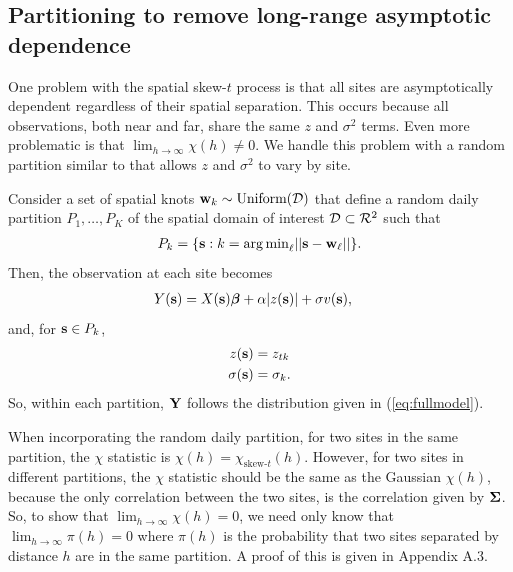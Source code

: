 \documentclass[11pt]{article}
\begin{document}
\subsection{Partitioning to remove long-range asymptotic dependence}\label{s:part}
One problem with the spatial skew-$t$ process is that all sites are asymptotically dependent regardless of their spatial separation.
This occurs because all observations, both near and far, share the same $z$ and $\sigma^2$ terms.
Even more problematic is that $\lim_{h \rightarrow \infty} \chi(h) \neq 0$.
We handle this problem with a random partition similar to \citet{Kim2005} that allows $z$ and $\sigma^2$ to vary by site.

Consider a set of spatial knots $\mbox{\bf w}_{k} \sim \text{Uniform}({\cal D})$ that define a random daily partition $P_{1}, \ldots, P_{K}$ of the spatial domain of interest ${\cal D} \subset {\cal R}^2$ such that
\begin{align*}
  P_{k} = \{ \mbox{\bf s} : k = {\mathop{\rm arg\, min}}_\ell || \mbox{\bf s} - \mbox{\bf w}_{\ell} || \}.
\end{align*}
Then, the observation at each site becomes
\begin{align}
  Y(\mbox{\bf s}) &= X(\mbox{\bf s}) \mbox{\boldmath $\beta$} + \alpha |z(\mbox{\bf s})| + \sigma v(\mbox{\bf s}),
\end{align}
and, for $\mbox{\bf s} \in P_{k}$,
\begin{align}
  z(\mbox{\bf s}) &= z_{tk} \label{eq:sitez}\\
  \sigma(\mbox{\bf s}) &= \sigma_{k} \label{eq:sitesig}.
\end{align}
So, within each partition, $\mbox{\bf Y}$ follows the distribution given in (\ref{eq:fullmodel}).

When incorporating the random daily partition, for two sites in the same partition, the $\chi$ statistic is $\chi(h) = \chi_{\text{skew-}t}(h)$. However, for two sites in different partitions, the $\chi$ statistic should be the same as the Gaussian $\chi(h)$, because the only correlation between the two sites, is the correlation given by $\mbox{\boldmath $\Sigma$}$.
So, to show that $\lim_{h \rightarrow \infty} \chi(h) = 0$, we need only know that $\lim_{h \rightarrow \infty} \pi(h) = 0$
where $\pi(h)$ is the probability that two sites separated by distance $h$ are in the same partition.
A proof of this is given in Appendix A.3.
\end{document}
